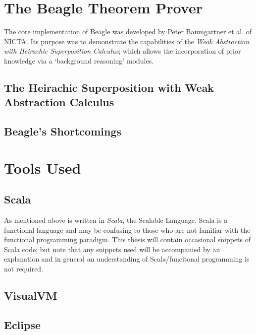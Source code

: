 \section{The Beagle Theorem Prover}
\label{sec:beagle}

The core implementation of Beagle was developed by Peter Baumgartner et al. of NICTA.
Its purpose was to demonstrate the capabilities of the \emph{Weak Abstraction with Heirachic Superposition Calculus};
which allows the incorporation of prior knowledge via a `background reasoning' modules.


\subsection{The Heirachic Superposition with Weak Abstraction Calculus}

\subsection{Beagle's Shortcomings}



\section{Tools Used}

\subsection{Scala}
\label{sec:scala}

As mentioned above \beagle is written in \emph{Scala}, the Scalable Language. Scala
is a functional language and may be confusing to those who are not familiar with the
functional programming paradigm. This thesis will contain occasional snippets of
Scala code; but note that any snippets used will be accompanied by an explanation
and in general an understanding of Scala/funcitonal programming is not required.

\subsection{VisualVM}

\subsection{Eclipse}

